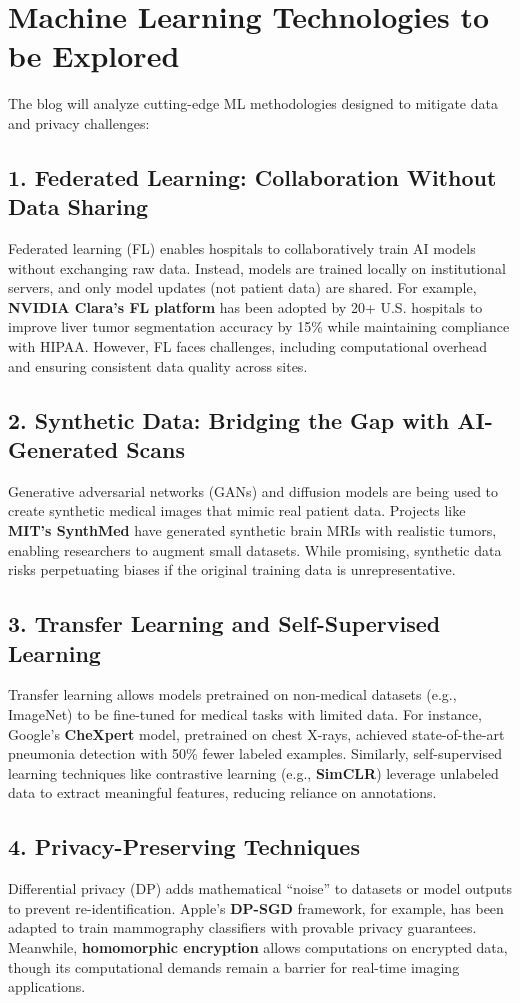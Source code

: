 \documentclass{article}
\begin{document}
\section{Machine Learning Technologies to be Explored}
The blog will analyze cutting-edge ML methodologies designed to mitigate data and privacy challenges:
\subsection*{1. Federated Learning: Collaboration Without Data Sharing}
Federated learning (FL) enables hospitals to collaboratively train AI models without exchanging raw data. Instead, models are trained locally on institutional servers, and only model updates (not patient data) are shared. For example, \textbf{NVIDIA Clara’s FL platform} has been adopted by 20+ U.S. hospitals to improve liver tumor segmentation accuracy by 15\% while maintaining compliance with HIPAA. However, FL faces challenges, including computational overhead and ensuring consistent data quality across sites.

\subsection*{2. Synthetic Data: Bridging the Gap with AI-Generated Scans}
Generative adversarial networks (GANs) and diffusion models are being used to create synthetic medical images that mimic real patient data. Projects like \textbf{MIT’s SynthMed} have generated synthetic brain MRIs with realistic tumors, enabling researchers to augment small datasets. While promising, synthetic data risks perpetuating biases if the original training data is unrepresentative.

\subsection*{3. Transfer Learning and Self-Supervised Learning}
Transfer learning allows models pretrained on non-medical datasets (e.g., ImageNet) to be fine-tuned for medical tasks with limited data. For instance, Google’s \textbf{CheXpert} model, pretrained on chest X-rays, achieved state-of-the-art pneumonia detection with 50\% fewer labeled examples. Similarly, self-supervised learning techniques like contrastive learning (e.g., \textbf{SimCLR}) leverage unlabeled data to extract meaningful features, reducing reliance on annotations.

\subsection*{4. Privacy-Preserving Techniques}
Differential privacy (DP) adds mathematical “noise” to datasets or model outputs to prevent re-identification. Apple’s \textbf{DP-SGD} framework, for example, has been adapted to train mammography classifiers with provable privacy guarantees. Meanwhile, \textbf{homomorphic encryption} allows computations on encrypted data, though its computational demands remain a barrier for real-time imaging applications.
\end{document}
